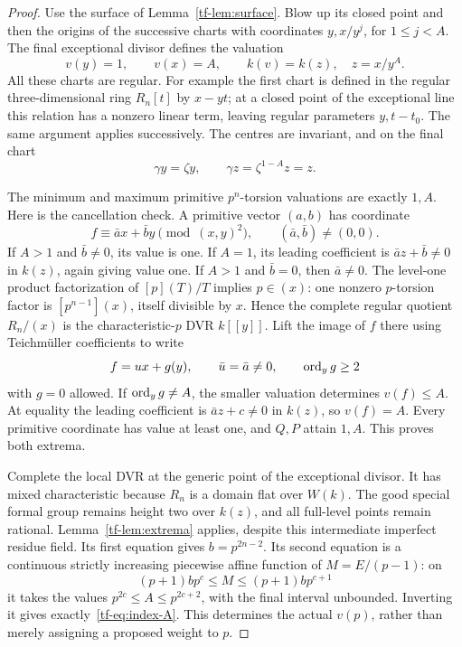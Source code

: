 \begin{proof}
Use the surface of Lemma~\ref{tf-lem:surface}. Blow up its closed point and then the origins of the successive charts with coordinates $y,x/y^j$, for $1\le j<A$. The final exceptional divisor defines the valuation
\[
 v(y)=1,\qquad v(x)=A,
 \qquad k(v)=k(z),\quad z=x/y^A.
\]
All these charts are regular. For example the first chart is defined in the regular three-dimensional ring $R_n[t]$ by $x-yt$; at a closed point of the exceptional line this relation has a nonzero linear term, leaving regular parameters $y,t-t_0$. The same argument applies successively. The centres are invariant, and on the final chart
\[
 \gamma y=\zeta y,\qquad\gamma z=\zeta^{1-A}z=z.
\]

The minimum and maximum primitive $p^n$-torsion valuations are exactly $1,A$. Here is the cancellation check. A primitive vector $(a,b)$ has coordinate
\[
 f\equiv\bar a x+\bar b y\pmod{(x,y)^2},
 \qquad(\bar a,\bar b)\ne(0,0).
\]
If $A>1$ and $\bar b\ne0$, its value is one. If $A=1$, its leading coefficient is $\bar a z+\bar b\ne0$ in $k(z)$, again giving value one. If $A>1$ and $\bar b=0$, then $\bar a\ne0$. The level-one product factorization of $[p](T)/T$ implies $p\in(x)$: one nonzero $p$-torsion factor is $[p^{n-1}](x)$, itself divisible by $x$. Hence the complete regular quotient $R_n/(x)$ is the characteristic-$p$ DVR $k[[y]]$. Lift the image of $f$ there using Teichm\"uller coefficients to write
\[
 f=ux+g(y),\qquad \bar u=\bar a\ne0,
 \qquad \operatorname{ord}_y g\ge2
\]
with $g=0$ allowed. If $\operatorname{ord}_y g\ne A$, the smaller valuation determines $v(f)\le A$. At equality the leading coefficient is $\bar a z+c\ne0$ in $k(z)$, so $v(f)=A$. Every primitive coordinate has value at least one, and $Q,P$ attain $1,A$. This proves both extrema.

Complete the local DVR at the generic point of the exceptional divisor. It has mixed characteristic because $R_n$ is a domain flat over $W(k)$. The good special formal group remains height two over $k(z)$, and all full-level points remain rational. Lemma~\ref{tf-lem:extrema} applies, despite this intermediate imperfect residue field. Its first equation gives $b=p^{2n-2}$. Its second equation is a continuous strictly increasing piecewise affine function of $M=E/(p-1)$: on
\[
 (p+1)bp^c\le M\le(p+1)bp^{c+1}
\]
it takes the values $p^{2c}\le A\le p^{2c+2}$, with the final interval unbounded. Inverting it gives exactly~\eqref{tf-eq:index-A}. This determines the actual $v(p)$, rather than merely assigning a proposed weight to $p$.


\end{proof}
